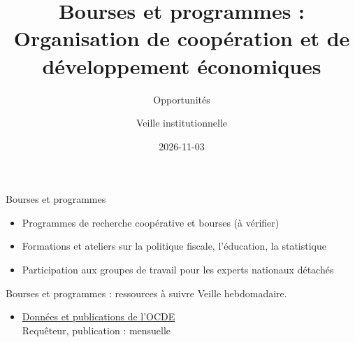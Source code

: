\documentclass[aspectratio=169,11pt]{beamer}
\title{Bourses et programmes : Organisation de coopération et de développement économiques}
\subtitle{Opportunités}
\author{Veille institutionnelle}
\date{2026-11-03}
\begin{document}
\begin{frame}\titlepage\end{frame}

\begin{frame}{Bourses et programmes}
\begin{itemize}
\item Programmes de recherche coopérative et bourses (à vérifier)
\item Formations et ateliers sur la politique fiscale, l'éducation, la statistique
\item Participation aux groupes de travail pour les experts nationaux détachés
\end{itemize}
\end{frame}

\begin{frame}{Bourses et programmes : ressources à suivre}
\small
Veille hebdomadaire.
\begin{itemize}
\item \href{https://data-explorer.oecd.org}{Données et publications de l'OCDE}\\{\footnotesize Requêteur, publication : mensuelle}
\end{itemize}
\end{frame}
\end{document}

